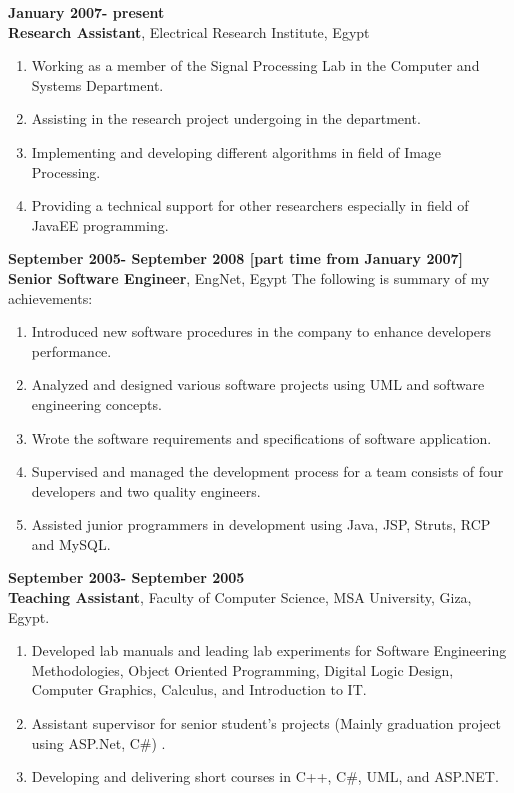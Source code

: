 \documentclass{article}
\begin{document}
 \textbf{January 2007- present}\\
 \textbf{Research Assistant}, Electrical Research Institute, Egypt
 \begin{enumerate}
\item Working as a member of the Signal Processing Lab in the Computer and
Systems Department.
 \item Assisting in the research project undergoing in the department.
 \item Implementing and developing different algorithms in field of Image
 Processing.
 \item Providing a technical support for other researchers especially in field
 of JavaEE programming.
\end{enumerate}

 \textbf{September 2005- September 2008 [part time from January 2007] }\\
 \textbf{Senior Software Engineer}, EngNet, Egypt\textbf{}
 The following is summary of my achievements:
 \begin{enumerate}

\item Introduced new software procedures in the company to enhance developers performance.
 \item Analyzed and designed various software projects using UML and software engineering concepts.
 \item Wrote the software requirements and specifications of software
 application.
 \item Supervised and managed the development process for a team consists of four developers and two quality engineers.
 \item Assisted junior programmers in development using Java, JSP, Struts, RCP and MySQL.
\end{enumerate}

 \textbf{September 2003- September 2005}\\
 \textbf{Teaching Assistant}, Faculty of Computer Science, MSA University, Giza, Egypt.\textbf{}
 \begin{enumerate}
\item Developed lab manuals and leading lab experiments for Software Engineering
Methodologies, Object Oriented Programming, Digital Logic Design, Computer Graphics, Calculus, and Introduction to IT.
 \item Assistant supervisor for senior student's projects (Mainly graduation project using ASP.Net, C\#) .
 \item Developing and delivering short courses in C++, C\#, UML, and ASP.NET.
\end{enumerate}
\end{document}
